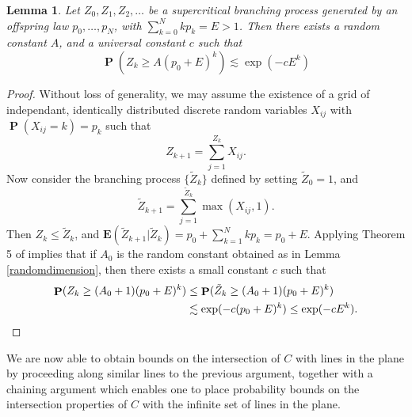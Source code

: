 \documentclass[dvipsnames,letterpaper,12pt]{article}
\numberwithin{equation}{section}
\theoremstyle{plain}
\newtheorem{lemma}{Lemma}
\DeclareMathOperator{\Prob}{\mathbf{P}}
\begin{document}
\begin{lemma}\label{branchingtrick}
	Let $Z_0, Z_1, Z_2, \dots$ be a supercritical branching process generated by an offspring law $p_0, \dots, p_N$, with $\sum_{k = 0}^N k p_k = E > 1$. Then there exists a random constant $A$, and a universal constant $c$ such that
	\[ \Prob(Z_k \geq A (p_0 + E)^k) \lesssim \exp(-c E^k) \]
\end{lemma}
\begin{proof}
	Without loss of generality, we may assume the existence of a grid of independant, identically distributed discrete random variables $X_{ij}$ with $\Prob(X_{ij} = k) = p_k$ such that
	\[ Z_{k+1} = \sum_{j = 1}^{Z_k} X_{ij}. \]
	Now consider the branching process $\{ \tilde{Z}_k \}$ defined by setting $\tilde{Z}_0 = 1$, and
	\[ \tilde{Z}_{k+1} = \sum_{j = 1}^{\tilde{Z}_k} \max(X_{ij}, 1). \]
	Then $Z_k \leq \tilde{Z}_k$, and $\mathbf{E}(\tilde{Z}_{k+1}|\tilde{Z}_k) = p_0 + \sum_{k = 1}^N k p_k = p_0 + E$. Applying Theorem 5 of \cite{Athreya} implies that if $A_0$ is the random constant obtained as in Lemma \ref{randomdimension}, then there exists a small constant $c$ such that
	\begin{align*}
		\Prob(Z_k \geq (A_0+1) (p_0 + E)^k) &\leq \Prob(\tilde{Z}_k \geq (A_0+1) (p_0 + E)^k)\\
		&\lesssim \exp(-c (p_0 + E)^k ) \leq \exp(-c E^k). \qedhere
	\end{align*}
\end{proof}

We are now able to obtain bounds on the intersection of $C$ with lines in the plane by proceeding along similar lines to the previous argument, together with a chaining argument which enables one to place probability bounds on the intersection properties of $C$ with the infinite set of lines in the plane.
\end{document}
